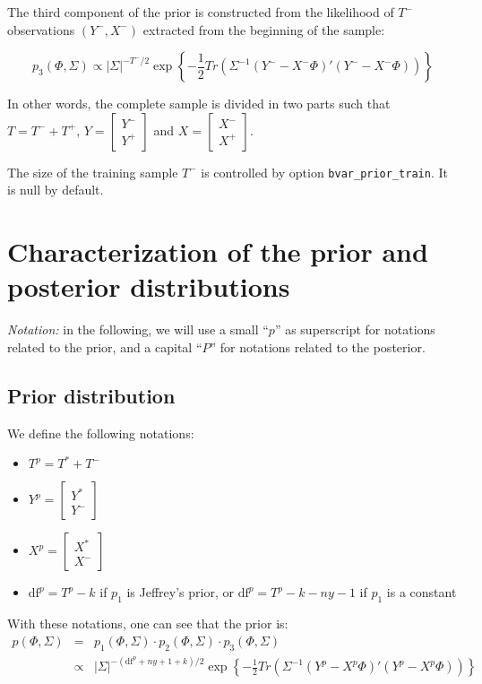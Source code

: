 \documentclass[11pt,a4paper]{article}
\newcommand{\df}{\text{df}}
\begin{document}
The third component of the prior is constructed from the likelihood of $T^-$ observations $(Y^-,X^-)$ extracted from the beginning of the sample:

$$p_3(\Phi, \Sigma) \propto |\Sigma|^{-T^-/2} \exp\left\{-\frac{1}{2}Tr(\Sigma^{-1}(Y^--X^-\Phi)'(Y^--X^-\Phi))\right\}$$

In other words, the complete sample is divided in two parts such that $T = T^- + T^+$,
$Y = \left[
\begin{array}{c}
Y^- \\
Y^+
\end{array}
\right]$ and
$X = \left[
\begin{array}{c}
X^- \\
X^+
\end{array}
\right]$.

The size of the training sample $T^-$ is controlled by option \texttt{bvar\_prior\_train}. It is null by default.

\section{Characterization of the prior and posterior distributions}

\textit{Notation:} in the following, we will use a small ``$p$'' as superscript for notations related to the prior, and a capital ``$P$'' for notations related to the posterior.

\subsection{Prior distribution}
\label{prior-distrib}

We define the following notations:
\begin{itemize}
\item $T^p = T^* + T^-$
\item
$Y^p = \left[
\begin{array}{c}
Y^* \\
Y^-
\end{array}
\right]$
\item
$X^p = \left[
\begin{array}{c}
X^* \\
X^-
\end{array}
\right]$
\item $\df^p = T^p - k$ if $p_1$ is Jeffrey's prior, or $\df^p = T^p - k - ny - 1$ if $p_1$ is a constant
\end{itemize}

With these notations, one can see that the prior is:
\begin{eqnarray*}
p(\Phi, \Sigma) & = & p_1(\Phi, \Sigma)\cdot p_2(\Phi, \Sigma)\cdot p_3(\Phi, \Sigma) \\
& \propto & |\Sigma|^{-(\df^p + ny + 1 + k)/2} \exp\left\{-\frac{1}{2}Tr(\Sigma^{-1}(Y^p-X^p\Phi)'(Y^p-X^p\Phi))\right\}
\end{eqnarray*}
\end{document}
